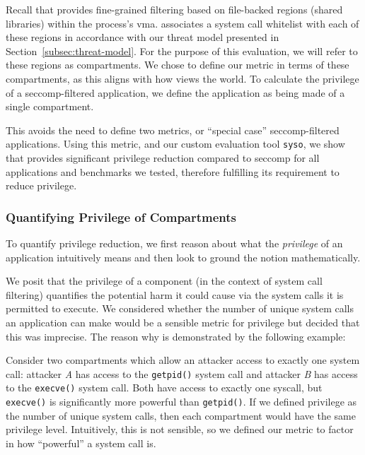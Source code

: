 Recall that \af provides fine-grained filtering based on file-backed
regions (shared libraries) within the process's \ac{vma}. \af associates a 
system call whitelist with each of these regions in accordance with our threat
model presented in Section~\ref{subsec:threat-model}. For the purpose of this
evaluation, we will refer to these regions as compartments. We chose to
define our metric in terms of these compartments, as this aligns with how \af
views the world. To calculate the privilege of a seccomp-filtered application,
we define the application as being made of a single compartment. 

This avoids the need to define two metrics, or ``special case'' 
seccomp-filtered applications.  Using this metric, and our custom evaluation
tool \texttt{syso}, we show that \af provides significant privilege
reduction compared to seccomp  for all applications and benchmarks we tested,
therefore fulfilling its requirement to reduce privilege.
 
\subsubsection{Quantifying Privilege of
Compartments}\label{subsubsec:eval-quant-privilege}

To quantify privilege reduction, we first reason about what the 
\textit{privilege} of an application intuitively means and then look to ground
the notion mathematically.

We posit that the privilege of a component (in the context of system call
filtering) quantifies the potential harm it could cause via the system calls
it is permitted to execute. We considered whether the number of unique
system calls an application can make would be a sensible metric for privilege
but decided that this was imprecise. The reason why is
demonstrated by the following example:  

Consider two compartments which allow an attacker access to
exactly one system call: attacker \textit{A} has access to the 
\texttt{getpid()} system call and attacker \textit{B} has access to the
\texttt{execve()} system call. Both have access to exactly one syscall, but
\texttt{execve()} is significantly more powerful than \texttt{getpid()}.
If we defined privilege as the number of unique system calls, then each compartment
would have the same privilege level. Intuitively, this is not sensible, so we
defined our metric to factor in how ``powerful'' a system call is. 

